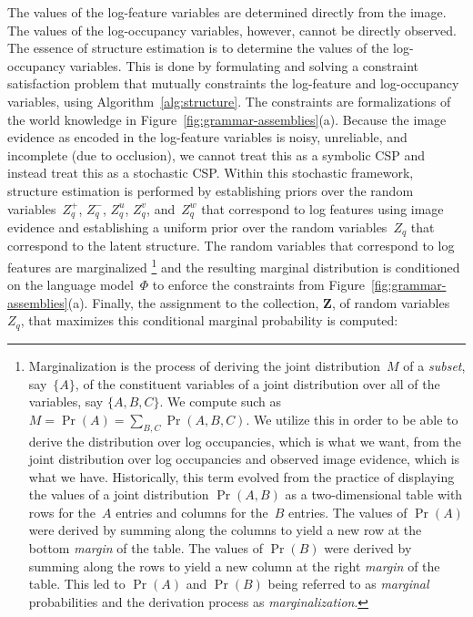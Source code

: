 The values of the log-feature variables are determined directly from the image.
%
The values of the log-occupancy variables, however, cannot be directly observed.
%
The essence of structure estimation is to determine the values of the
log-occupancy variables.
%
This is done by formulating and solving a constraint satisfaction problem that
mutually constraints the log-feature and log-occupancy variables, using
Algorithm~\ref{alg:structure}.
%
The constraints are formalizations of the world knowledge in
Figure~\ref{fig:grammar-assemblies}(a).
%
Because the image evidence as encoded in the log-feature variables is noisy,
unreliable, and incomplete (due to occlusion), we cannot treat this as a
symbolic CSP and instead treat this as a stochastic CSP.
%
Within this stochastic framework, structure estimation is performed by
establishing priors over the random variables~$Z^+_q$, $Z^-_q$, $Z^u_q$,
$Z^v_q$, and~$Z^w_q$ that correspond to log features using image evidence and
establishing a uniform prior over the random variables~$Z_q$ that correspond to
the latent structure.
%
The random variables that correspond to log features are marginalized
\footnote{Marginalization is the process of deriving the joint distribution~$M$
  of a \emph{subset}, say~$\{A\}$, of the constituent variables of a joint
  distribution over all of the variables, say $\{A,B,C\}$.
  We compute such as $M = \Pr\left(A\right) = \sum_{B,C} \Pr\left(A,B,C\right)$.
  We utilize this in order to be able to derive the distribution over log
  occupancies, which is what we want, from the joint distribution over
  log occupancies and observed image evidence, which is what we have.
  Historically, this term evolved from the practice of displaying the values of
  a joint distribution $\Pr(A,B)$ as a two-dimensional table with rows for
  the~$A$ entries and columns for the~$B$ entries.
  The values of $\Pr(A)$ were derived by summing along the columns to yield a
  new row at the bottom \emph{margin} of the table.
  The values of $\Pr(B)$ were derived by summing along the rows to yield a
  new column at the right \emph{margin} of the table.
  This led to $\Pr(A)$ and $\Pr(B)$ being referred to as \emph{marginal}
  probabilities and the derivation process as \emph{marginalization}.}
and the resulting marginal distribution is conditioned on the language
model~$\Phi$ to enforce the constraints from
Figure~\ref{fig:grammar-assemblies}(a).
%
Finally, the assignment to the collection, $\mathbf{Z}$, of random
variables~$Z_q$, that maximizes this conditional marginal probability is
computed:

